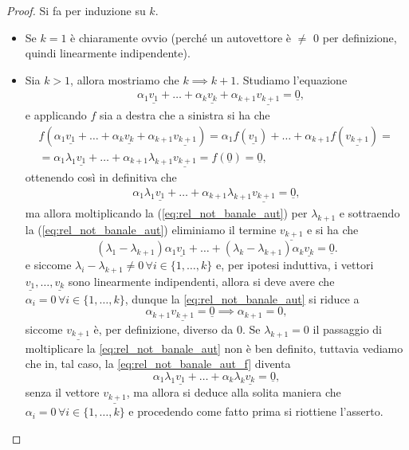 \begin{proof}
    Si fa per induzione su $k$.
    \begin{itemize}
        \item Se $k=1$ è chiaramente ovvio (perché un autovettore è $\neq$ 0 per definizione, quindi linearmente indipendente).
        \item Sia $k > 1$, allora mostriamo che $k \implies k+1$. Studiamo l'equazione
        \begin{align} \label{eq:rel_not_banale_aut}
            &\alpha_1 \underline{v_1} + \ldots + \alpha_k \underline{v_k} + \alpha_{k+1} \underline{v_{k+1}} = \underline{0},
        \end{align}
        e applicando $f$ sia a destra che a sinistra si ha che
        \begin{align}
            &f(\alpha_1 \underline{v_1} + \ldots + \alpha_k \underline{v_k} + \alpha_{k+1} \underline{v_{k+1}}) = \alpha_1 f(\underline{v_1}) + \ldots + \alpha_{k+1} f(\underline{v_{k+1}}) = & & \\
            &= \alpha_1 \lambda_1 \underline{v_1} + \ldots + \alpha_{k+1} \lambda_{k+1} \underline{v_{k+1}} = f(\underline{0}) = \underline{0}, & &
        \end{align}
        ottenendo così in definitiva che
        \begin{align} \label{eq:rel_not_banale_aut_f}
            \alpha_1 \lambda_1 \underline{v_1} + \ldots + \alpha_{k+1} \lambda_{k+1} \underline{v_{k+1}} = \underline{0},
        \end{align}
        ma allora moltiplicando la (\ref{eq:rel_not_banale_aut}) per $\lambda_{k+1}$ e sottraendo la (\ref{eq:rel_not_banale_aut}) eliminiamo il termine $\underline{v_{k+1}}$ e si ha che
        $$
            (\lambda_1 - \lambda_{k+1}) \alpha_1 \underline{v_1} + \ldots + (\lambda_{k} - \lambda_{k+1}) \alpha_{k} \underline{v_k} = \underline{0}.
        $$
        e siccome $\lambda_i - \lambda_{k+1} \neq 0 \, \forall i \in \{ 1, \ldots, k \}$ e, per ipotesi induttiva, i vettori $\underline{v_1}, \ldots, \underline{v_k}$ sono linearmente indipendenti, allora si deve avere che 
        $\alpha_i = 0 \, \forall i \in \{ 1, \ldots, k \}$, dunque la \ref{eq:rel_not_banale_aut} si riduce a
        $$
            \alpha_{k+1} \underline{v_{k+1}} = \underline{0} \implies \alpha_{k+1} = 0,
        $$
        siccome $\underline{v_{k+1}}$ è, per definizione, diverso da $0$. Se $\lambda_{k+1} = 0$ il passaggio di moltiplicare la \ref{eq:rel_not_banale_aut} non è ben definito, tuttavia vediamo che in, tal caso, la \ref{eq:rel_not_banale_aut_f} diventa
        $$
            \alpha_1 \lambda_1 \underline{v_1} + \ldots + \alpha_k \lambda_{k} \underline{v_k} = \underline{0},
        $$
        senza il vettore $\underline{v_{k+1}}$, ma allora si deduce alla solita maniera che $\alpha_i = 0 \, \forall i \in \{ 1, \ldots, k \}$ e procedendo come fatto prima si riottiene l'asserto.
    \end{itemize}
\end{proof}
